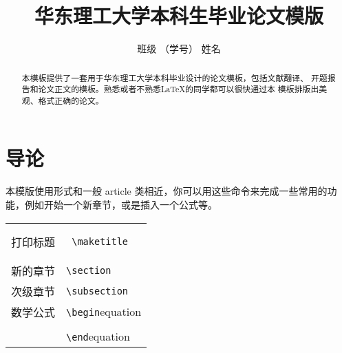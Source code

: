 \documentclass[openning]{article}
\author{班级 （学号） 姓名}
\title{华东理工大学本科生毕业论文模版}
\begin{document}
\begin{abstract}
  本模板提供了一套用于华东理工大学本科毕业设计的论文模板，包括文献翻译、
  开题报告和论文正文的模板。熟悉或者不熟悉\LaTeX 的同学都可以很快通过本
  模板排版出美观、格式正确的论文。
\end{abstract}

\section{导论}

本模版使用形式和一般 article 类相近，你可以用这些命令来完成一些常用的功
能，例如开始一个新章节，或是插入一个公式等。
\begin{comments}
  
\begin{tabular}{r l}
  打印标题 & \begin{verbatim} \maketitle \end{verbatim} \\
  新的章节 & \verb{\section{}} \\
  次级章节 & \verb{\subsection{}} \\
  数学公式 & \verb{\begin{equation}} \\
         & \verb{  x = x + 1. } \\
         & \verb{\end{equation}} \\
          
\end{tabular}

\end{comments}
\end{document}
